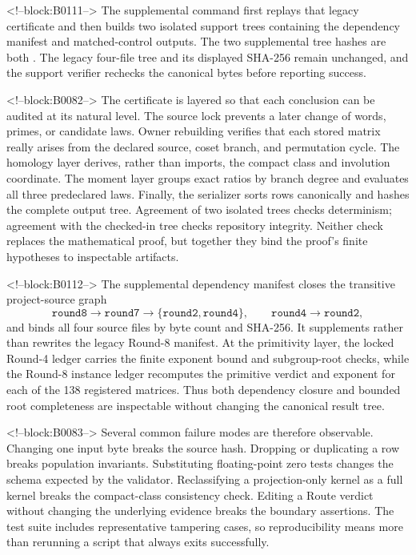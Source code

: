 \documentclass[11pt]{article}
\theoremstyle{definition}
\theoremstyle{remark}
\begin{document}
<!--block:B0111-->
The supplemental command
first replays that legacy certificate and then builds two isolated support trees containing the dependency manifest and matched-control outputs. The two supplemental tree hashes are both
.
The legacy four-file tree and its displayed SHA-256 remain unchanged, and the support verifier rechecks the canonical bytes before reporting success.

<!--block:B0082-->
The certificate is layered so that each conclusion can be audited at its natural level. The source lock prevents a later change of words, primes, or candidate laws. Owner rebuilding verifies that each stored matrix really arises from the declared source, coset branch, and permutation cycle. The homology layer derives, rather than imports, the compact class and involution coordinate. The moment layer groups exact ratios by branch degree and evaluates all three predeclared laws. Finally, the serializer sorts rows canonically and hashes the complete output tree. Agreement of two isolated trees checks determinism; agreement with the checked-in tree checks repository integrity. Neither check replaces the mathematical proof, but together they bind the proof's finite hypotheses to inspectable artifacts.

<!--block:B0112-->
The supplemental dependency manifest closes the transitive project-source graph
\[
\texttt{round8}\longrightarrow\texttt{round7}
\longrightarrow\{\texttt{round2},\texttt{round4}\},
\qquad
\texttt{round4}\longrightarrow\texttt{round2},
\]
and binds all four source files by byte count and SHA-256. It supplements rather than rewrites the legacy Round-8 manifest. At the primitivity layer, the locked Round-4 ledger carries the finite exponent bound and subgroup-root checks, while the Round-8 instance ledger recomputes the primitive verdict and exponent for each of the 138 registered matrices. Thus both dependency closure and bounded root completeness are inspectable without changing the canonical result tree.

<!--block:B0083-->
Several common failure modes are therefore observable. Changing one input byte breaks the source hash. Dropping or duplicating a row breaks population invariants. Substituting floating-point zero tests changes the schema expected by the validator. Reclassifying a projection-only kernel as a full kernel breaks the compact-class consistency check. Editing a Route verdict without changing the underlying evidence breaks the boundary assertions. The test suite includes representative tampering cases, so reproducibility means more than rerunning a script that always exits successfully.
\end{document}
